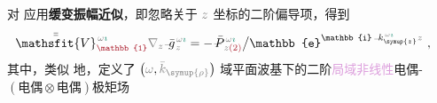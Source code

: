 对  应用\textbf{\textcolor{NavyBlue}{缓变振幅}近似}，即忽略关于 $\mathcolor{gray}{z}$ 坐标的二阶偏导项，得到
\begin{align} \label{eq:nonlinear(2)-wave_wkrho-simplify6-V2'-SVA}
	\Xint{\mathcolor{gray}{-}}{25}{\bar{\bar{\mathsfit{V}}}}^{\;\! \mathcolor{gray}{\omega} \textcolor{PineGreen}{\imath}}_{\textcolor{Maroon}{\mathbb{1}}} \mathcolor{gray}{\nabla_z} \Xint{{}^{}_{\mathcolor{gray}{-}}}{10}{\bar{g}}^{\;\!\mathcolor{gray}{\omega} \textcolor{PineGreen}{\imath}}_{\;\! \mathcolor{gray}{z}} = - \Xint{\mathcolor{gray}{-}}{30}{\bar{P}}^{\;\! \mathcolor{gray}{\omega} \textcolor{PineGreen}{\imath}}_{\;\! \mathcolor{gray}{z} \textcolor{Maroon}{(2)}} \big/ \mathbb{e}^{\mathbb{i} \Xint{\begin{smallmatrix} ~ \\ {}^{}_{\mathcolor{gray}{-}} \\ ~ \end{smallmatrix}}{15}{k}_{\symup{z}}^{\;\! \mathcolor{gray}{\omega} \textcolor{PineGreen}{\imath}} \mathcolor{gray}{z}} ~,
\end{align}
其中，类似  地，定义了 $\left( \mathcolor{gray}{\omega}, \mathcolor{gray}{\bar{k}_{\symup{\rho}}} \right)$ 域\textcolor{PineGreen}{平面波基}下的二阶\textcolor{Plum}{局域}\textcolor{Plum}{非线性}\textcolor{NavyBlue}{电偶-$(\text{电偶}\otimes\text{电偶})$}极矩场
